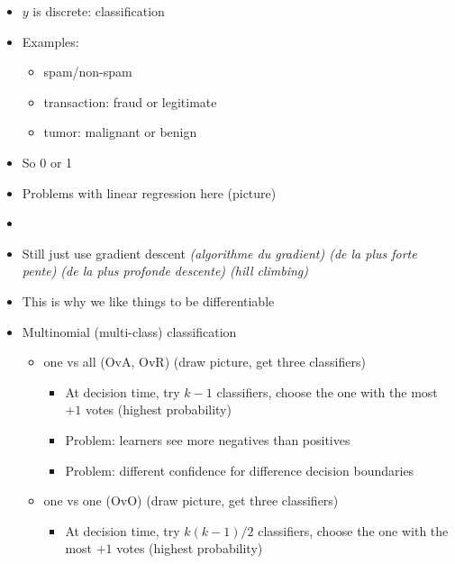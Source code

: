 




\begin{itemize}
\item $y$ is discrete: classification
\item Examples:
  \begin{itemize}
  \item spam/non-spam
  \item transaction: fraud or legitimate
  \item tumor: malignant or benign
  \end{itemize}
\item So 0 or 1
\item Problems with linear regression here (picture)
\item {}
\end{itemize}

\begin{itemize}
\item Still just use gradient descent \textit{(algorithme du gradient) (de la plus forte pente) (de la plus profonde descente) (hill climbing)}
\item This is why we like things to be differentiable
\item Multinomial (multi-class) classification
  \begin{itemize}
  \item one vs all (OvA, OvR) (draw picture, get three classifiers)
    \begin{itemize}
    \item At decision time, try $k-1$ classifiers, choose the one with
      the most $+1$ votes (highest probability)
    \item Problem: learners see more negatives than positives
    \item Problem: different confidence for difference decision boundaries
    \end{itemize}
  \item one vs one (OvO) (draw picture, get three classifiers)
    \begin{itemize}
    \item At decision time, try $k(k-1)/2$ classifiers, choose the one with
      the most $+1$ votes (highest probability)
    \end{itemize}

  \end{itemize}

\end{itemize}

